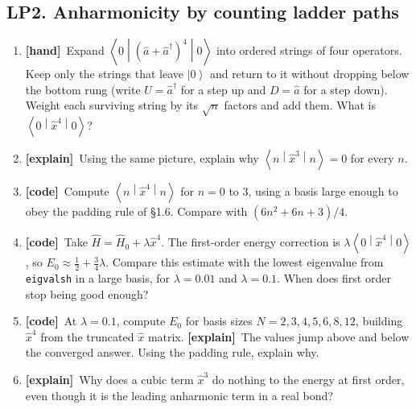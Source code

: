 \documentclass[11pt]{article}
\newif\ifsolutions
\newcommand{\tagbox}[2]{\textcolor{#1}{\textsf{\textbf{[#2]}}}}
\newcommand{\hand}{\tagbox{handc}{hand}}
\newcommand{\code}{\tagbox{codec}{code}}
\newcommand{\expl}{\tagbox{explc}{explain}}
\newcommand{\ans}[1]{\ifsolutions\par\noindent\hspace*{1.5em}\textcolor{ansc}{\small\textit{Answer:} #1}\fi}
\newcommand{\ket}[1]{\left|#1\right\rangle}
\newcommand{\mel}[3]{\left\langle#1\middle|#2\middle|#3\right\rangle}
\newcommand{\ad}{\hat{a}^{\dagger}}
\newcommand{\aop}{\hat{a}}
\newcommand{\xop}{\hat{x}}
\newcommand{\Hop}{\hat{H}}
\newcommand{\py}[1]{\texttt{#1}}
\begin{document}
\subsection*{LP2. Anharmonicity by counting ladder paths}

\begin{enumerate}
\item \hand\ Expand $\mel{0}{(\aop+\ad)^4}{0}$ into ordered strings of four operators.
Keep only the strings that leave $\ket0$ and return to it without dropping below the bottom rung
(write $U = \ad$ for a step up and $D = \aop$ for a step down).
Weight each surviving string by its $\sqrt n$ factors and add them. What is $\mel{0}{\xop^4}{0}$?
\ans{UUDD has weight $\sqrt1\sqrt2\sqrt2\sqrt1 = 2$; UDUD has weight $1$. Total $3$, so $\mel{0}{\xop^4}{0} = 3/4$.}

\item \expl\ Using the same picture, explain why $\mel{n}{\xop^3}{n} = 0$ for every $n$.
\ans{Three steps of $\pm1$ cannot add to zero, so no string returns to $\ket n$.}

\item \code\ Compute $\mel{n}{\xop^4}{n}$ for $n = 0$ to $3$, using a basis large enough to obey the padding rule of \S1.6.
Compare with $(6n^2 + 6n + 3)/4$.
\ans{$0.75,\ 3.75,\ 9.75,\ 18.75$.}

\item \code\ Take $\Hop = \Hop_0 + \lambda\xop^4$. The first-order energy correction is $\lambda\mel{0}{\xop^4}{0}$, so $E_0 \approx \tfrac12 + \tfrac34\lambda$.
Compare this estimate with the lowest eigenvalue from \py{eigvalsh} in a large basis, for $\lambda = 0.01$ and $\lambda = 0.1$.
When does first order stop being good enough?
\ans{$\lambda=0.01$: $0.5075$ vs.\ $0.50726$. $\ \lambda = 0.1$: $0.575$ vs.\ $0.55915$. The error grows like $\lambda^2$; by $\lambda = 0.1$ it is about 3\%.}

\item \code\ At $\lambda = 0.1$, compute $E_0$ for basis sizes $N = 2, 3, 4, 5, 6, 8, 12$, building $\xop^4$ from the truncated $\xop$ matrix.
\expl\ The values jump above and below the converged answer. Using the padding rule, explain why.
\ans{$0.525,\ 0.5696,\ 0.5578,\ 0.5586,\ 0.5594,\ 0.5591,\ 0.5591$. $N=4$ falls \emph{below} the exact $0.5591$: the truncated $\xop^4$ is wrong near the top of the ladder (paths that need the missing rungs are lost), so it is not the true $\xop^4$ restricted to the basis and the result is not a variational upper bound.}

\item \expl\ Why does a cubic term $\xop^3$ do nothing to the energy at first order, even though it is the leading anharmonic term in a real bond?
\ans{By (b), $\mel{n}{\xop^3}{n} = 0$; the cubic term first contributes at second order.}
\end{enumerate}
\end{document}
